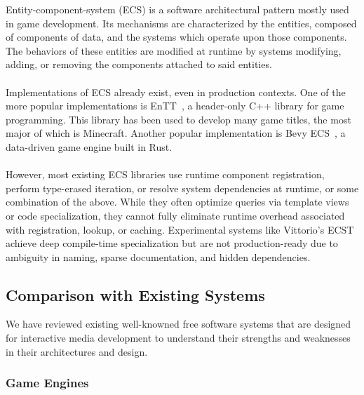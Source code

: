 Entity-component-system (ECS) is a software architectural pattern mostly used in game development.
Its mechanisms are characterized by the entities, composed of components of data,
and the systems which operate upon those components.
The behaviors of these entities are modified at runtime by systems modifying, adding, or removing the components
attached to said entities.
\\\\
Implementations of ECS already exist, even in production contexts.
One of the more popular implementations is EnTT~\cite{ValtoLibraries_EnTT}, a header-only C++ library for game programming.
This library has been used to develop many game titles, the most major of which is Minecraft.
Another popular implementation is Bevy ECS~\cite{Bevy_Engine}, a data-driven game engine built in Rust.
\\\\
However, most existing ECS libraries use runtime component registration, perform type-erased iteration, or resolve
system dependencies at runtime, or some combination of the above.
While they often optimize queries via template views or code specialization, they cannot fully eliminate
runtime overhead associated with registration, lookup, or caching.
Experimental systems like Vittorio's ECST~\cite{vittorio} achieve deep compile-time specialization
but are not production-ready due to ambiguity in naming, sparse documentation, and hidden dependencies.

\subsection{Comparison with Existing Systems}
\label{subsec:comparison-with-existing-systems}

We have reviewed existing well-knowned free software systems that are designed for interactive media 
development to understand their strengths and weaknesses in their architectures and design.

\subsubsection*{Game Engines}

